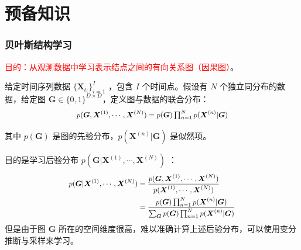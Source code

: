 \documentclass{beamer}
\begin{document}
\section{预备知识}
\begin{frame}
\frametitle{贝叶斯结构学习}

\textcolor{red}{目的：从观测数据中学习表示结点之间的有向关系图（因果图）}。

给定时间序列数据 $\{\boldsymbol X_{t_i}\}_{i=1}^{I}$ ，包含 $I$ 个时间点。假设有 $N$ 个独立同分布的数据，给定图 $\boldsymbol G\in\{0,1\}^{D\times D}$，定义图与数据的联合分布：
\begin{equation}\scalebox{0.9}{$
p(\boldsymbol{G},\boldsymbol{X}^{(1)},\cdots,\boldsymbol{X}^{(N)})=p(\boldsymbol{G})\prod_{n=1}^{N}p(\boldsymbol{X}^{(n)}|\boldsymbol{G})$}
\end{equation}

其中 $p(\boldsymbol{G})$ 是图的先验分布，$p(\boldsymbol{X}^{(n)}|\boldsymbol{G})$ 是似然项。

目的是学习后验分布 $p(\boldsymbol G|\boldsymbol X^{(1)},\cdots, \boldsymbol X^{(N)})$ ：
\begin{equation}\scalebox{0.9}{$
\begin{aligned}
     p(\boldsymbol{G}|\boldsymbol X^{(1)},\cdots, \boldsymbol X^{(N)})&=\dfrac{p(\boldsymbol{G},\boldsymbol{X}^{(1)},\cdots,\boldsymbol{X}^{(N)})}{p(\boldsymbol{X}^{(1)},\cdots,\boldsymbol{X}^{(N)})}\\
    &=\dfrac{p(\boldsymbol{G})\prod_{n=1}^{N}p(\boldsymbol{X}^{(n)}|\boldsymbol{G})}{\sum_{\boldsymbol{G}}p(\boldsymbol{G})\prod_{n=1}^{N}p(\boldsymbol{X}^{(n)}|\boldsymbol{G})}
\end{aligned}$}
\end{equation}
但是由于图 $\boldsymbol{G}$ 所在的空间维度很高，难以准确计算上述后验分布，可以使用变分推断与采样来学习。
\end{frame}
\end{document}
